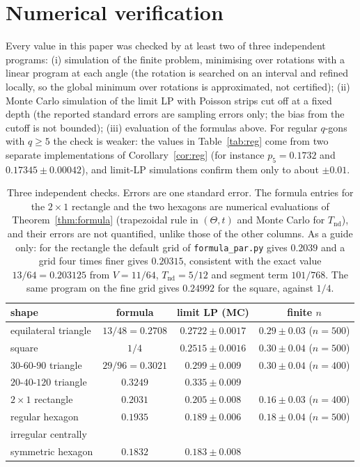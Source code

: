 \documentclass[11pt]{amsart}
\theoremstyle{remark}\newtheorem{remark}[theorem]{Remark}
\begin{document}
\section{Numerical verification}\label{sec:num}

Every value in this paper was checked by at least two of three independent programs: (i) simulation of the
finite problem, minimising over rotations with a linear program at each angle (the rotation is searched on an
interval and refined locally, so the global minimum over rotations is approximated, not certified); (ii) Monte Carlo simulation of the
limit LP with Poisson strips cut off at a fixed depth (the reported standard errors are sampling errors only; the
bias from the cutoff is not bounded); (iii) evaluation of the formulas above. For regular $q$-gons with $q\ge5$ the check is
weaker: the values in Table~\ref{tab:reg} come from two separate implementations of Corollary~\ref{cor:reg} (for
instance $p_5=0.1732$ and $0.17345\pm0.00042$), and limit-LP simulations confirm them only to about $\pm0.01$.

\begin{table}[ht]
\centering
\begin{tabular}{lccc}
\toprule
shape & formula & limit LP (MC) & finite $n$ \\
\midrule
equilateral triangle & $13/48=0.2708$ & $0.2722\pm0.0017$ & $0.29\pm0.03$ ($n=500$)\\
square & $1/4$ & $0.2515\pm0.0016$ & $0.30\pm0.04$ ($n=500$)\\
$30$-$60$-$90$ triangle & $29/96=0.3021$ & $0.299\pm0.009$ & $0.30\pm0.04$ ($n=400$)\\
$20$-$40$-$120$ triangle & $0.3249$ & $0.335\pm0.009$ & \\
$2\times1$ rectangle & $0.2031$ & $0.205\pm0.008$ & $0.16\pm0.03$ ($n=400$)\\
regular hexagon & $0.1935$ & $0.189\pm0.006$ & $0.18\pm0.04$ ($n=500$)\\
irregular centrally\\ \quad symmetric hexagon & $0.1832$ & $0.183\pm0.008$ & \\
\bottomrule
\end{tabular}
\caption{Three independent checks. Errors are one standard error. The formula entries for the $2\times1$
rectangle and the two hexagons are numerical evaluations of Theorem~\ref{thm:formula} (trapezoidal rule in
$(\Theta,t)$ and Monte Carlo for $T_{\mathrm{nd}}$), and their errors are not quantified, unlike those of the other
columns. As a guide only: for the rectangle the default grid of \texttt{formula\_par.py} gives $0.2039$ and a grid
four times finer gives $0.20315$, consistent with the exact value $13/64=0.203125$ from $V=11/64$, $T_{\mathrm{nd}}=5/12$ and segment term
$101/768$. The same program on the fine grid gives $0.24992$ for the square, against $1/4$.}
\label{tab:checks}
\end{table}
\end{document}
